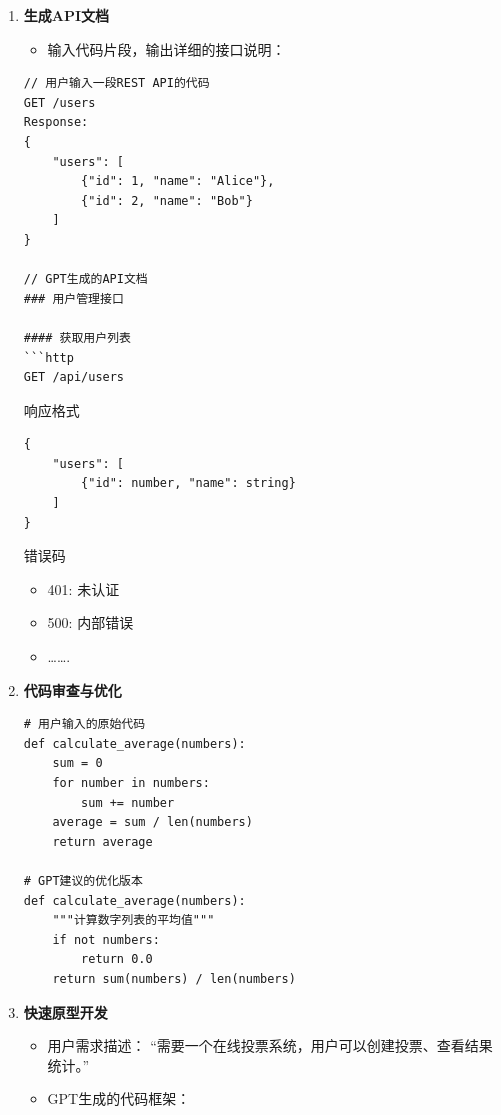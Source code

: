 \begin{enumerate}
  \def\labelenumi{\arabic{enumi}.}
  \item
        \textbf{生成API文档}

        \begin{itemize}
          \item
                输入代码片段，输出详细的接口说明：
        \end{itemize}

        \begin{lstlisting}
// 用户输入一段REST API的代码
GET /users
Response:
{
    "users": [
        {"id": 1, "name": "Alice"},
        {"id": 2, "name": "Bob"}
    ]
}

// GPT生成的API文档
### 用户管理接口

#### 获取用户列表
```http
GET /api/users
\end{lstlisting}

        响应格式

        \begin{lstlisting}
{
    "users": [
        {"id": number, "name": string}
    ]
}
\end{lstlisting}

        错误码

        \begin{itemize}
          \item
                401: 未认证
          \item
                500: 内部错误
          \item
                \ldots{}\ldots{}.
        \end{itemize}

  \item
        \textbf{代码审查与优化}

        \begin{lstlisting}
# 用户输入的原始代码
def calculate_average(numbers):
    sum = 0
    for number in numbers:
        sum += number
    average = sum / len(numbers)
    return average

# GPT建议的优化版本
def calculate_average(numbers):
    """计算数字列表的平均值"""
    if not numbers:
        return 0.0
    return sum(numbers) / len(numbers)
\end{lstlisting}
  \item
        \textbf{快速原型开发}

        \begin{itemize}
          \item
                用户需求描述：
                ``需要一个在线投票系统，用户可以创建投票、查看结果统计。''
          \item
                GPT生成的代码框架：


\end{itemize}
\end{enumerate}
